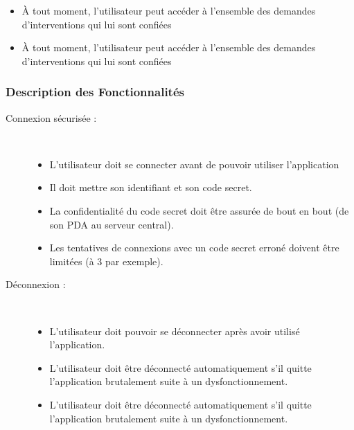 \begin{enumerate}
\begin{itemize}
    \item À tout moment, l’utilisateur peut accéder à l’ensemble des demandes d’interventions 
    qui lui sont confiées

    \item À tout moment, l’utilisateur peut accéder à l’ensemble des demandes d’interventions qui lui sont confiées

	\end{itemize}
\end{enumerate}


\subsubsection{Description des Fonctionnalités}

\begin{description}
\item [Connexion sécurisée :] \hfill\\
	\begin{itemize}
	\item L'utilisateur doit se connecter avant de pouvoir utiliser l'application\\
	\item Il doit mettre son identifiant et son code secret.\\
	\item La confidentialité du code secret doit être assurée de bout en bout (de son PDA au serveur central).\\
	\item Les tentatives de connexions avec un code secret erroné doivent être limitées (à 3 par exemple).
	\end{itemize}

\item [Déconnexion :]\hfill\\
	\begin{itemize}
	\item L'utilisateur doit pouvoir se déconnecter après avoir utilisé l'application.\\

	\item L'utilisateur doit être déconnecté automatiquement s'il quitte l'application 
	brutalement suite à un dysfonctionnement.\\

	\item L'utilisateur doit être déconnecté automatiquement s'il quitte l'application brutalement suite à un dysfonctionnement.\\


\end{itemize}
\end{description}
